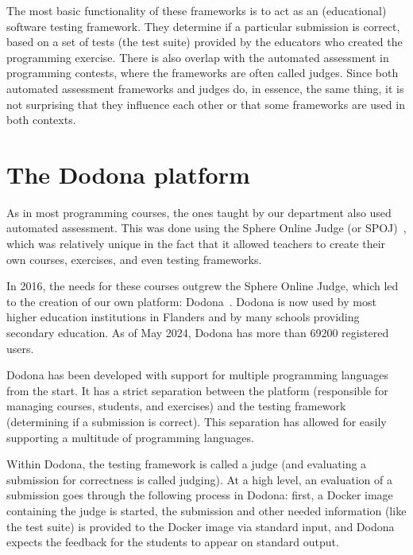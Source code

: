 \documentclass[./main]{subfiles}
\begin{document}
The most basic functionality of these frameworks is to act as an (educational) software testing framework.
They determine if a particular submission is correct, based on a set of tests (the test suite) provided by the educators who created the programming exercise.
There is also overlap with the automated assessment in programming contests, where the frameworks are often called judges.
Since both automated assessment frameworks and judges do, in essence, the same thing, it is not surprising that they influence each other or that some frameworks are used in both contexts.

\section{The Dodona platform}\label{sec:dodona}

As in most programming courses, the ones taught by our department also used automated assessment.
This was done using the Sphere Online Judge (or SPOJ)~\autocite{kosowskiApplicationOnlineJudge2007}, which was relatively unique in the fact that it allowed teachers to create their own courses, exercises, and even testing frameworks.

In 2016, the needs for these courses outgrew the Sphere Online Judge, which led to the creation of our own platform: Dodona~\autocite{vanpetegemDodonaLearnCode2023}.
Dodona is now used by most higher education institutions in Flanders and by many schools providing secondary education.
As of May 2024, Dodona has more than \num{69200} registered users.

Dodona has been developed with support for multiple programming languages from the start.
It has a strict separation between the platform (responsible for managing courses, students, and exercises) and the testing framework (determining if a submission is correct).
This separation has allowed for easily supporting a multitude of programming languages.

Within Dodona, the testing framework is called a judge (and evaluating a submission for correctness is called judging).
At a high level, an evaluation of a submission goes through the following process in Dodona: first, a Docker image containing the judge is started, the submission and other needed information (like the test suite) is provided to the Docker image via standard input, and Dodona expects the feedback for the students to appear on standard output.
\end{document}
